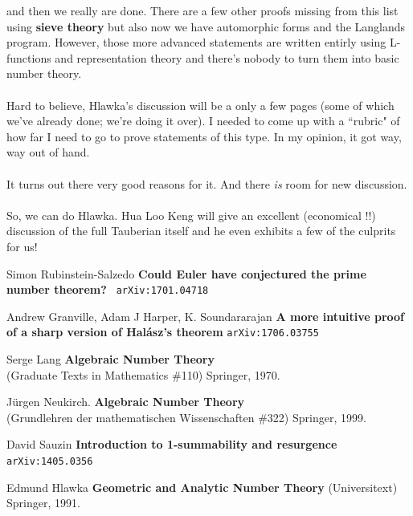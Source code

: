 \documentclass[12pt]{article}
\begin{document}
and then we really are done.  There are a few other proofs missing from this list using \textbf{sieve theory} but also now we have automorphic forms and the Langlands program.  However, those more advanced statements are written entirly using L-functions and representation theory and there's nobody to turn them into basic number theory. \\ \\
Hard to believe, Hlawka's discussion will be a only a few pages (some of which we've already done; we're doing it over).  I needed to come up with a ``rubric" of how far I need to go to prove statements of this type.  In my opinion, it got way, way out of hand.   \\ \\
It turns out there very good reasons for it.  And there \textit{is} room for new discussion.   \\ \\
So, we can do Hlawka. Hua Loo Keng will give an excellent (economical !!) discussion of the full Tauberian itself and he even exhibits a few of the culprits for us!

\vfill


\begin{thebibliography}{}

\item Simon Rubinstein-Salzedo \textbf{Could Euler have conjectured the prime number theorem?} \texttt{ arXiv:1701.04718}
\item Andrew Granville, Adam J Harper, K. Soundararajan \textbf{A more intuitive proof of a sharp version of Hal\'{a}sz's theorem} \texttt{arXiv:1706.03755}

\item Serge Lang \textbf{Algebraic Number Theory} \\
(Graduate Texts in Mathematics \#110) Springer, 1970.

\item J\"{u}rgen Neukirch. \textbf{Algebraic Number Theory} \\ (Grundlehren der mathematischen Wissenschaften \#322) Springer, 1999.

\item David Sauzin \textbf{Introduction to 1-summability and resurgence} \texttt{arXiv:1405.0356}

\item Edmund Hlawka \textbf{Geometric and Analytic Number Theory} (Universitext) Springer, 1991.

\end{thebibliography}
\end{document}
